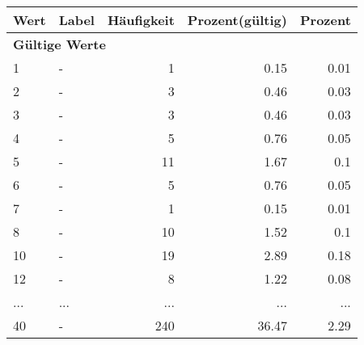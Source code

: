      \begin{longtable}{lXrrr}
     \toprule
     \textbf{Wert} & \textbf{Label} & \textbf{Häufigkeit} & \textbf{Prozent(gültig)} & \textbf{Prozent} \\
     \endhead
     \midrule
     \multicolumn{5}{l}{\textbf{Gültige Werte}}\\
        1 & \multicolumn{1}{X}{-} & %
          \num{1} &
          \num[round-mode=places,round-precision=2]{0,15} &
          \num[round-mode=places,round-precision=2]{0,01} \\
        2 & \multicolumn{1}{X}{-} & %
          \num{3} &
          \num[round-mode=places,round-precision=2]{0,46} &
          \num[round-mode=places,round-precision=2]{0,03} \\
        3 & \multicolumn{1}{X}{-} & %
          \num{3} &
          \num[round-mode=places,round-precision=2]{0,46} &
          \num[round-mode=places,round-precision=2]{0,03} \\
        4 & \multicolumn{1}{X}{-} & %
          \num{5} &
          \num[round-mode=places,round-precision=2]{0,76} &
          \num[round-mode=places,round-precision=2]{0,05} \\
        5 & \multicolumn{1}{X}{-} & %
          \num{11} &
          \num[round-mode=places,round-precision=2]{1,67} &
          \num[round-mode=places,round-precision=2]{0,1} \\
        6 & \multicolumn{1}{X}{-} & %
          \num{5} &
          \num[round-mode=places,round-precision=2]{0,76} &
          \num[round-mode=places,round-precision=2]{0,05} \\
        7 & \multicolumn{1}{X}{-} & %
          \num{1} &
          \num[round-mode=places,round-precision=2]{0,15} &
          \num[round-mode=places,round-precision=2]{0,01} \\
        8 & \multicolumn{1}{X}{-} & %
          \num{10} &
          \num[round-mode=places,round-precision=2]{1,52} &
          \num[round-mode=places,round-precision=2]{0,1} \\
        10 & \multicolumn{1}{X}{-} & %
          \num{19} &
          \num[round-mode=places,round-precision=2]{2,89} &
          \num[round-mode=places,round-precision=2]{0,18} \\
        12 & \multicolumn{1}{X}{-} & %
          \num{8} &
          \num[round-mode=places,round-precision=2]{1,22} &
          \num[round-mode=places,round-precision=2]{0,08} \\
       ... & ... & ... & ... & ... \\
        40 & \multicolumn{1}{X}{-} & %
          \num{240} &
          \num[round-mode=places,round-precision=2]{36,47} &
          \num[round-mode=places,round-precision=2]{2,29} \\


\end{longtable}
